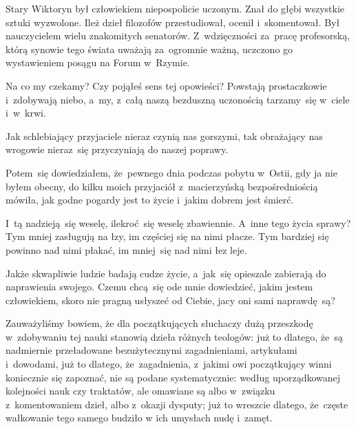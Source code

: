 
\noi Stary Wiktoryn był człowiekiem niepospolicie uczonym. Znał do
głębi wszystkie sztuki wyzwolone. Ileż dzieł filozofów przestudiował,
ocenił i~skomentował. Był nauczycielem wielu znakomitych
senatorów. Z~wdzięczności za~pracę profesorską, którą synowie tego
świata uważają za~ogromnie ważną, uczczono go wystawieniem posągu na
Forum w~Rzymie.


\noi Na co my czekamy? Czy pojąłeś sens tej opowieści? Powstają
prostaczkowie i~zdobywają niebo, a~my, z~całą naszą bezduszną
uczonością tarzamy~się w~ciele i~w~krwi.


\noi Jak schlebiający przyjaciele nieraz czynią nas gorszymi, tak
obrażający nas wrogowie nieraz~się przyczyniają do naszej poprawy.


\noi Potem~się dowiedziałem, że~pewnego dnia podczas pobytu w~Ostii,
gdy ja nie byłem obecny, do kilku moich przyjaciół z~macierzyńską
bezpośredniością mówiła, jak godne pogardy jest to życie i~jakim
dobrem jest śmierć.


\noi I~tą nadzieją~się weselę, ilekroć~się weselę zbawiennie. A~inne
tego życia sprawy? Tym mniej zasługują na łzy, im częściej się na nimi
płacze. Tym bardziej się powinno nad nimi płakać, im mniej~się nad
nimi łez leje.


\noi Jakże skwapliwie ludzie badają cudze życie, a~jak~się opieszale
zabierają do naprawienia swojego. Czemu chcą~się ode mnie dowiedzieć,
jakim jestem człowiekiem, skoro nie pragną usłyszeć od Ciebie, jacy
oni sami naprawdę~są?





Zauważyliśmy bowiem, że dla początkujących słuchaczy dużą przeszkodę
w~zdobywaniu tej nauki stanowią dzieła różnych teologów: już to
dlatego, że~są nadmiernie przeładowane bezużytecznymi zagadnieniami,
artykułami i~dowodami, już to dlatego, że~zagadnienia, z~jakimi owi
początkujący winni koniecznie się zapoznać, nie są podane
systematycznie: według uporządkowanej kolejności nauk czy traktatów,
ale omawiane są albo w~związku z~komentowaniem dzieł, albo z~okazji
dysputy; już to wreszcie dlatego, że~częste wałkowanie tego samego
budziło w ich umysłach nudę i~zamęt.

